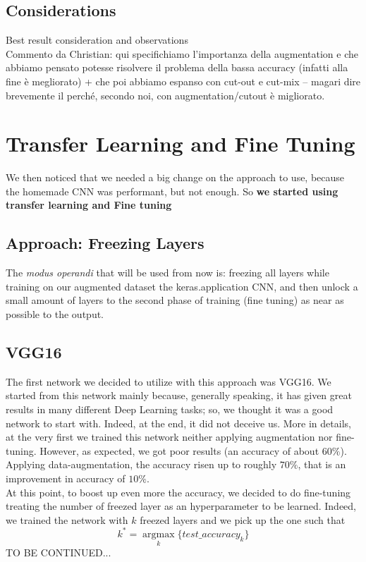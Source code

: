 \documentclass[10pt]{article}
\begin{document}
\subsection{Considerations}
Best result consideration and observations \\
Commento da Christian: qui specifichiamo l'importanza della augmentation e che abbiamo pensato potesse risolvere il problema della bassa accuracy (infatti alla fine è megliorato) + che poi abbiamo espanso con cut-out e cut-mix -- magari dire brevemente il perché, secondo noi, con augmentation/cutout è migliorato.
\section{Transfer Learning and Fine Tuning}
We then noticed that we needed a big change on the approach to use, because the homemade
CNN was performant, but not enough. So \textbf{we started using transfer learning and Fine tuning}

\subsection{Approach: Freezing Layers}
The \textit{modus operandi} that will be used from now is: freezing all layers while training on our augmented dataset the keras.application
CNN, and then unlock a small amount of layers to the second phase of training (fine tuning) as near as possible to the output.
\subsection{VGG16}
The first network we decided to utilize with this approach was VGG16. We started from this network mainly because, generally speaking, it has given great results in many different Deep Learning tasks; so, we thought it was a good network to start with. Indeed, at the end, it did not deceive us. More in details, at the very first we trained this network neither applying augmentation nor fine-tuning. However, as expected, we got poor results (an accuracy of about $60\%$). Applying data-augmentation, the accuracy risen up to roughly $70\%$, that is an improvement in accuracy of $10\%$.\\
At this point, to boost up even more the accuracy, we decided to do fine-tuning treating the number of freezed layer as an hyperparameter to be learned. Indeed, we trained the network with $k$ freezed layers and we pick up the one such that
\begin{equation*}
    k^* = \underset{k}{\operatorname{argmax}}\{test\_accuracy_{k}\}
\end{equation*}
TO BE CONTINUED...
\end{document}
